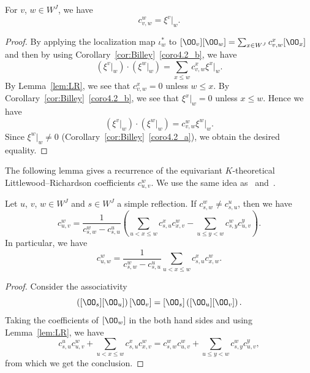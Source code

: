 \begin{prop}
\label{prop:LR=xi}
For $v$, $w \in W^J$, we have
\begin{equation}
\label{eq:LR=xi}
c^w_{v,w} = \xi^v|_w.
\end{equation}
\end{prop}

\begin{proof}
By applying the localization map $\iota_w^*$ to 
$[\OO_v] [\OO_w] = \sum_{x \in W^J} c^x_{v,w} [\OO_x]$ 
and then by using Corollary~\ref{cor:Billey}~\ref{coro4.2_b}, we have
$$
\left( \xi^v|_w \right) \cdot \left( \xi^w|_w \right)
 =
\sum_{x \le w} c^x_{v,w} \xi^x|_w.
$$
By Lemma~\ref{lem:LR}, we see that $c^x_{v,w} = 0$ unless $w \le x$.
By Corollary~\ref{cor:Billey}~\ref{coro4.2_b}, we see that $\xi^x|_w = 0$ unless $x \le w$.
Hence we have
$$
\left( \xi^v|_w \right) \cdot \left( \xi^w|_w \right)
 =
c^w_{v,w} \xi^w|_w.
$$
Since $\xi^w|_w \neq 0$ (Corollary~\ref{cor:Billey}~\ref{coro4.2_a}), we obtain the desired equality.
\end{proof}

The following lemma gives a recurrence of the equivariant $K$-theoretical 
Little\-wood--Richardson coefficients $c^w_{u,v}$.
We use the same idea as~\cite[Corollary~6.5]{M} and~\cite[Proposition~3.1]{PY}.

\begin{lemm}
\label{lem:recLR}
Let $u$, $v$, $w \in W^J$ and $s \in W^J$ a simple reflection.
If $c^w_{s,w} \neq c^u_{s,u}$, then we have
$$
c^w_{u,v}
 =
\frac{ 1 }
 { c^w_{s,w} - c^u_{s,u} }
\left(
 \sum_{u < x \le w} c^x_{s,u} c^w_{x,v}
 -
 \sum_{u \le y < w} c^w_{s,y} c^y_{u,v}
\right).
$$
In particular, we have
\begin{equation}
\label{eq:recLR}
c^w_{u,w}
 =
\frac{ 1 }
 { c^w_{s,w} - c^u_{s,u} }
\sum_{u < x \le w}
 c^x_{s,u} c^w_{x,w}.
\end{equation}
\end{lemm}

\begin{proof}
Consider the associativity
$$
\left( [\OO_s] [\OO_u] \right) [\OO_v]
 =
[\OO_s] \left( [\OO_u] [\OO_v] \right).
$$
Taking the coefficients of $[\OO_w]$ in the both hand sides and using Lemma~\ref{lem:LR}, 
we have
$$
c^u_{s,u} c^w_{u,v}
 +
\sum_{u < x \le w} c^x_{s,u} c^w_{x,v}
 =
c^w_{s,w} c^w_{u,v}
 +
\sum_{u \le y < w} c^w_{s,y} c^y_{u,v},
$$
from which we get the conclusion. 
\end{proof}

